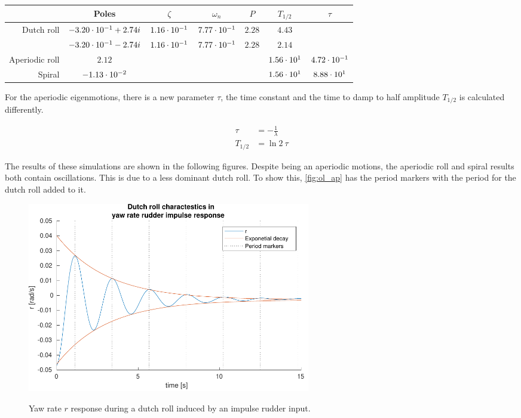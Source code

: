 \begin{center}
    \begin{tabular}{ r | c c c c c c }
                       & Poles                   & $\zeta$        & $\omega_n$     & $P$    & $T_{1/2}$     & $\tau$         \\ \hline \hline
        Dutch roll     & $-3.20\cdot 10^{-1} + 2.74i$ & $1.16\cdot 10^{-1}$ & $7.77\cdot 10^{-1}$ & $2.28$ & $4.43$        &                \\  
                       & $-3.20\cdot 10^{-1} - 2.74i$ & $1.16\cdot 10^{-1}$ & $7.77\cdot 10^{-1}$ & $2.28$ & $2.14$        &                \\ \hline
        Aperiodic roll & $2.12$                  &                &                &        & $1.56\cdot 10^{1}$ & $4.72\cdot 10^{-1}$ \\ \hline 
        Spiral         & $-1.13\cdot 10^{-2}$         &                &                &        & $1.56\cdot 10^{1}$ & $8.88\cdot 10^{1}$
    \end{tabular}
\end{center}

For the aperiodic eigenmotions, there is a new parameter $\tau$, the time constant and the time to damp to half amplitude $T_{1/2}$ is calculated differently.

\begin{align}
    \tau &= -\frac{1}{\lambda} \\
    T_{1/2} &= \ln{2}\ \tau
\end{align}

The results of these simulations are shown in the following figures. Despite being an aperiodic motions, the aperiodic roll and spiral results both contain oscillations. This is due to a less dominant dutch roll. To show this, \autoref{fig:ol_ap} has the period markers with the period for the dutch roll added to it.

\begin{figure}[ht]
    \centering
    \includegraphics[width=0.6\textwidth]{figures/ol_dr}
    \label{fig:ol_dr}
    \caption{Yaw rate $r$ response during a dutch roll induced by an impulse rudder input.}
\end{figure}

